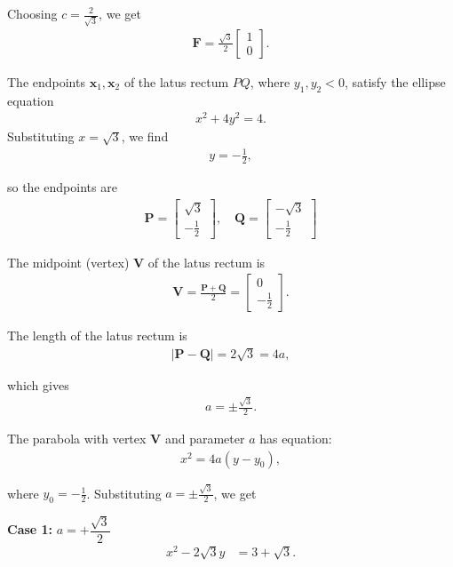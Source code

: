 \documentclass[journal]{IEEEtran}
\begin{document}
Choosing $c = \frac{2}{\sqrt{3}}$, we get
\begin{align}
\mathbf{F} = \frac{\sqrt{3}}{2} \begin{bmatrix} 1 \\ 0 \end{bmatrix}.
\end{align}

The endpoints $\mathbf{x}_1, \mathbf{x}_2$ of the latus rectum $PQ$, where $y_1, y_2 < 0$, satisfy the ellipse equation
\begin{align}
x^2 + 4 y^2 = 4.
\end{align}
Substituting $x = \sqrt{3}$, we find
\begin{align}
y = -\frac{1}{2},
\end{align}

so the endpoints are
\begin{align}
\mathbf{P} = \begin{bmatrix} \sqrt{3} \\ -\frac{1}{2} \end{bmatrix}, \quad
\mathbf{Q} = \begin{bmatrix} -\sqrt{3} \\ -\frac{1}{2} \end{bmatrix}
\end{align}

The midpoint (vertex) $\mathbf{V}$ of the latus rectum is
\begin{align}
\mathbf{V} = \frac{\mathbf{P} + \mathbf{Q}}{2} = \begin{bmatrix} 0 \\ -\frac{1}{2} \end{bmatrix}.
\end{align}

The length of the latus rectum is
\begin{align}
|\mathbf{P} - \mathbf{Q}| = 2 \sqrt{3} = 4a,
\end{align}

which gives
\begin{align}
a = \pm\frac{\sqrt{3}}{2}.
\end{align}


The parabola with vertex $\mathbf{V}$ and parameter $a$ has equation:
\begin{align}
x^2 = 4 a (y - y_0),
\end{align}

where $y_0 = -\frac{1}{2}$. Substituting $a =\pm\frac{\sqrt{3}}{2}$, we get


\textbf{Case 1:} $a = +\dfrac{\sqrt{3}}{2}$\\
\begin{align}
x^2 - 2\sqrt{3}y &= 3 + \sqrt{3}.
\end{align}
\end{document}
